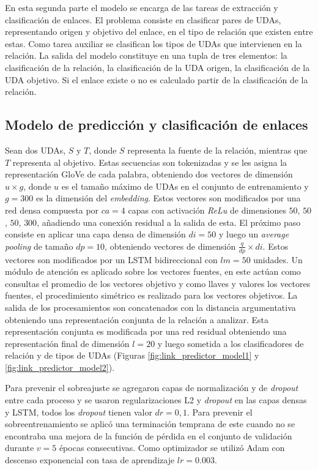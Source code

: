 En esta segunda parte el modelo se encarga de las tareas de extracción y clasificación de enlaces.
El problema consiste en clasificar pares de UDAs, representando origen y objetivo del enlace, 
en el tipo de relación que existen entre estas.
Como tarea auxiliar se clasifican los tipos de UDAs que intervienen en la relación. La salida 
del modelo constituye en una tupla de tres elementos: la clasificación de la relación, 
la clasificación de la UDA origen, la clasificación de la UDA objetivo. Si el enlace existe o no 
es calculado partir de la clasificación de la relación.   

\subsection{Modelo de predicción y clasificación de enlaces}

Sean dos UDAs, $S$ y $T$, donde $S$ representa la fuente de la relación, mientras que $T$ representa
al objetivo. Estas secuencias son tokenizadas y se les asigna la representación GloVe de cada palabra, obteniendo
dos vectores de dimensión $u \times g$, donde $u$ es el tamaño máximo de UDAs en el conjunto de entrenamiento
y $g=300$ es la dimensión del \emph{embedding}.
Estos vectores son modificados por una red densa compuesta por $ca = 4$ capas con activación \emph{ReLu}
de dimensiones $50$, $50$, $50$, $300$, añadiendo una conexión residual a la salida de esta. 
El próximo paso consiste en aplicar una capa densa de dimensión $di=50$ y luego un \emph{average pooling}
de tamaño $dp=10$, obteniendo vectores de dimensión $\frac{q}{dp} \times di$. 
Estos vectores son modificados por un LSTM bidireccional con $lm=50$ unidades. Un módulo de atención es aplicado 
sobre los vectores fuentes, 
en este actúan como consultas el promedio de los vectores objetivo y como llaves y valores los vectores fuentes,
el procedimiento simétrico es realizado para los vectores objetivos.
La salida de los procesamientos son concatenados con la distancia argumentativa obteniendo una representación 
conjunta de la relación a analizar. Esta representación conjunta es modificada por una red residual obteniendo
una representación final de dimensión $l=20$ y luego sometida a los clasificadores de relación y de tipos de UDAs
(Figuras \ref{fig:link_predictor_model1} y \ref{fig:link_predictor_model2}).

Para prevenir el sobreajuste se agregaron capas de normalización y de \emph{dropout} entre cada 
proceso y se usaron regularizaciones L2 y \emph{dropout} en las capas densas y LSTM, 
todos los \emph{dropout} tienen valor $dr=0,1$. Para prevenir el sobreentrenamiento se aplicó una 
terminación temprana de este cuando no se encontraba una mejora de la función de pérdida en el 
conjunto de validación durante $v=5$ épocas consecutivas. Como optimizador se utilizó Adam con descenso 
exponencial con tasa de aprendizaje $lr=0.003$.

